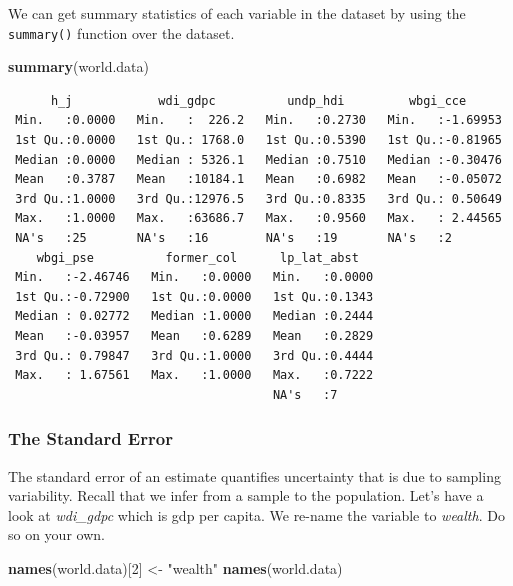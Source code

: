 \documentclass[]{article}
\newenvironment{Shaded}{\begin{snugshade}}{\end{snugshade}}
\newcommand{\KeywordTok}[1]{\textcolor[rgb]{0.13,0.29,0.53}{\textbf{#1}}}
\newcommand{\DecValTok}[1]{\textcolor[rgb]{0.00,0.00,0.81}{#1}}
\newcommand{\StringTok}[1]{\textcolor[rgb]{0.31,0.60,0.02}{#1}}
\newcommand{\NormalTok}[1]{#1}
\theoremstyle{definition}
\theoremstyle{definition}
\theoremstyle{definition}
\theoremstyle{remark}
\begin{document}
We can get summary statistics of each variable in the dataset by using
the \texttt{summary()} function over the dataset.

\begin{Shaded}
\begin{Highlighting}[]
\KeywordTok{summary}\NormalTok{(world.data)}
\end{Highlighting}
\end{Shaded}

\begin{verbatim}
      h_j            wdi_gdpc          undp_hdi         wbgi_cce       
 Min.   :0.0000   Min.   :  226.2   Min.   :0.2730   Min.   :-1.69953  
 1st Qu.:0.0000   1st Qu.: 1768.0   1st Qu.:0.5390   1st Qu.:-0.81965  
 Median :0.0000   Median : 5326.1   Median :0.7510   Median :-0.30476  
 Mean   :0.3787   Mean   :10184.1   Mean   :0.6982   Mean   :-0.05072  
 3rd Qu.:1.0000   3rd Qu.:12976.5   3rd Qu.:0.8335   3rd Qu.: 0.50649  
 Max.   :1.0000   Max.   :63686.7   Max.   :0.9560   Max.   : 2.44565  
 NA's   :25       NA's   :16        NA's   :19       NA's   :2         
    wbgi_pse          former_col      lp_lat_abst    
 Min.   :-2.46746   Min.   :0.0000   Min.   :0.0000  
 1st Qu.:-0.72900   1st Qu.:0.0000   1st Qu.:0.1343  
 Median : 0.02772   Median :1.0000   Median :0.2444  
 Mean   :-0.03957   Mean   :0.6289   Mean   :0.2829  
 3rd Qu.: 0.79847   3rd Qu.:1.0000   3rd Qu.:0.4444  
 Max.   : 1.67561   Max.   :1.0000   Max.   :0.7222  
                                     NA's   :7       
\end{verbatim}

\subsubsection{The Standard Error}\label{the-standard-error}

The standard error of an estimate quantifies uncertainty that is due to
sampling variability. Recall that we infer from a sample to the
population. Let's have a look at \emph{wdi\_gdpc} which is gdp per
capita. We re-name the variable to \emph{wealth}. Do so on your own.

\begin{Shaded}
\begin{Highlighting}[]
\KeywordTok{names}\NormalTok{(world.data)[}\DecValTok{2}\NormalTok{] <-}\StringTok{ "wealth"} 
\KeywordTok{names}\NormalTok{(world.data)}
\end{Highlighting}
\end{Shaded}
\end{document}
